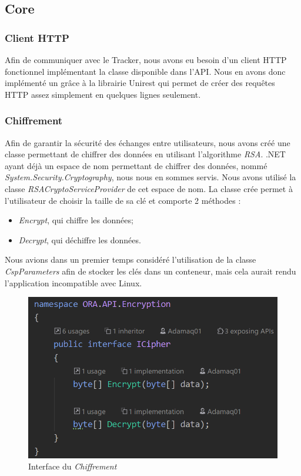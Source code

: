 \documentclass[11pt, a4paper]{report}
\begin{document}
    \subsection{Core}
    
      \subsubsection{Client HTTP}
        Afin de communiquer avec le Tracker, nous avons eu besoin d'un client HTTP fonctionnel implémentant la classe disponible dans l'API. Nous en avons donc implémenté un grâce à la librairie Unirest qui permet de créer des requêtes HTTP assez simplement en quelques lignes seulement.
        
\clearpage

      \subsubsection{Chiffrement}
      Afin de garantir la sécurité des échanges entre utilisateurs, nous avons créé une classe permettant de chiffrer des données en utilisant l'algorithme \textit{RSA}.\newline
      .NET ayant déjà un espace de nom permettant de chiffrer des données, nommé
      \textit{System.Security.Cryptography}, nous nous en sommes servis. Nous avons utilisé la classe \textit{RSACryptoServiceProvider} de cet espace de nom. La classe crée permet à l'utilisateur de choisir la taille de sa clé et comporte 2 méthodes :
      \begin{itemize}
          \item \textit{Encrypt}, qui chiffre les données;
          \item \textit{Decrypt}, qui déchiffre les données.
      \end{itemize}
      \bigbreak
    
      Nous avions dans un premier temps considéré l'utilisation de la classe \textit{CspParameters} afin de stocker les clés dans un conteneur, mais cela aurait rendu l'application incompatible avec Linux.

    \begin{figure}[H]
        \centering
        \includegraphics[width=15cm]{assets/presentation1/cipher_interface.png}
        \caption{Interface du \textit{Chiffrement}}
    \end{figure}
        
\end{document}
